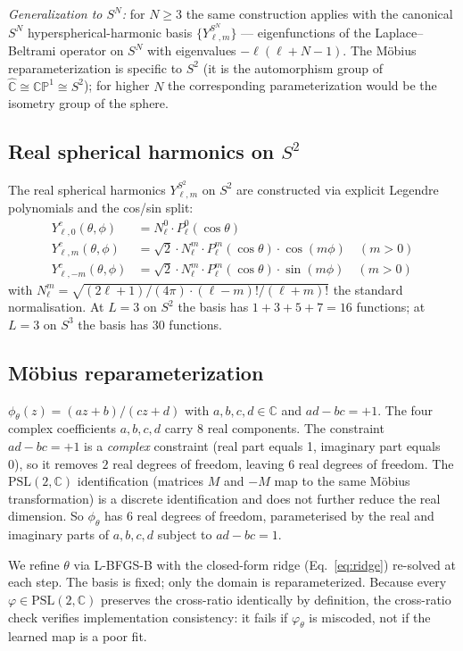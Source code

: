 \documentclass[11pt,a4paper]{article}
\begin{document}
\emph{Generalization to $S^N$:} for $N \geq 3$ the same construction applies with the canonical $S^N$ hyperspherical-harmonic basis $\{Y^{S^N}_{\ell,m}\}$ --- eigenfunctions of the Laplace--Beltrami operator on $S^N$ with eigenvalues $-\ell(\ell+N-1)$. The Möbius reparameterization is specific to $S^2$ (it is the automorphism group of $\widehat{\mathbb{C}} \cong \mathbb{CP}^1 \cong S^2$); for higher $N$ the corresponding parameterization would be the isometry group of the sphere.

\subsection{Real spherical harmonics on $S^2$}

The real spherical harmonics $Y^{S^2}_{\ell,m}$ on $S^2$ are constructed via explicit Legendre polynomials and the cos/sin split:
\begin{align}
Y^c_{\ell,0}(\theta,\phi) &= N_\ell^0 \cdot P_\ell^0(\cos\theta) \\
Y^c_{\ell,m}(\theta,\phi) &= \sqrt{2} \cdot N_\ell^m \cdot P_\ell^m(\cos\theta) \cdot \cos(m\phi) \quad (m > 0) \\
Y^c_{\ell,-m}(\theta,\phi) &= \sqrt{2} \cdot N_\ell^m \cdot P_\ell^m(\cos\theta) \cdot \sin(m\phi) \quad (m > 0)
\end{align}
with $N_\ell^m = \sqrt{(2\ell+1)/(4\pi) \cdot (\ell-m)!/(\ell+m)!}$ the standard normalisation. At $L=3$ on $S^2$ the basis has $1 + 3 + 5 + 7 = 16$ functions; at $L=3$ on $S^3$ the basis has $30$ functions.

\subsection{Möbius reparameterization}
\label{sec:mobius}

$\phi_\theta(z) = (az+b)/(cz+d)$ with $a,b,c,d \in \mathbb{C}$ and $ad-bc=+1$. The four complex coefficients $a,b,c,d$ carry $8$ real components. The constraint $ad-bc=+1$ is a \emph{complex} constraint (real part equals 1, imaginary part equals 0), so it removes $2$ real degrees of freedom, leaving $6$ real degrees of freedom. The $\mathrm{PSL}(2,\mathbb{C})$ identification (matrices $M$ and $-M$ map to the same Möbius transformation) is a discrete identification and does not further reduce the real dimension. So $\phi_\theta$ has $6$ real degrees of freedom, parameterised by the real and imaginary parts of $a,b,c,d$ subject to $ad-bc=1$.

We refine $\theta$ via L-BFGS-B with the closed-form ridge (Eq.~\ref{eq:ridge}) re-solved at each step. The basis is fixed; only the domain is reparameterized. Because every $\varphi \in \mathrm{PSL}(2,\mathbb{C})$ preserves the cross-ratio identically by definition, the cross-ratio check verifies implementation consistency: it fails if $\varphi_\theta$ is miscoded, not if the learned map is a poor fit.
\end{document}
